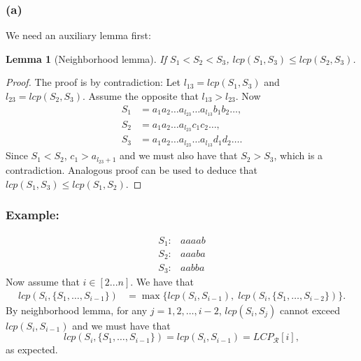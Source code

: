 \documentclass[10pt]{article}
\newtheorem{lemma}{Lemma}
\begin{document}
\subsubsection*{(a)}
We need an auxiliary lemma first: 
\begin{lemma}[Neighborhood lemma]
If $S_1 < S_2 < S_3$, $lcp(S_1, S_3) \leq lcp(S_2, S_3)$.
\end{lemma}
\begin{proof}
The proof is by contradiction: Let $l_{13} = lcp(S_1, S_3)$ and $l_{23} = lcp(S_2, S_3)$. Assume the opposite that $l_{13} > l_{23}$. 
Now 
\begin{align*}
S_1 &= a_1 a_2 \dots a_{l_{23}} \dots a_{l_{13}} b_1 b_2 \dots, \\
S_2 &= a_1 a_2 \dots a_{l_{23}} c_1 c_2 \dots, \\
S_3 &= a_1 a_2 \dots a_{l_{23}} \dots a_{l_{13}} d_1 d_2 \dots.
\end{align*}
Since $S_1 < S_2$, $c_1 > a_{l_{23} + 1}$ and we must also have that $S_2 > S_3$, which is a contradiction. Analogous proof can be used to deduce that $lcp(S_1, S_3) \leq lcp(S_1, S_2)$.
\end{proof}
\subsubsection*{Example:}
\begin{align*}
S_1: & aaaab \\
S_2: & aaaba \\
S_3: & aabba
\end{align*}
Now assume that $i \in [2...n]$. We have that
\begin{align*}
lcp(S_i, \{ S_1, \dots, S_{i - 1} \}) &= \max \{ lcp(S_i, S_{i - 1}), \; lcp(S_i, \{ S_1, \dots, S_{i - 2} \}) \}.
\end{align*}
By neighborhood lemma, for any $j = 1, 2, \dots, i - 2$, $lcp(S_i, S_j)$ cannot exceed $lcp(S_i, S_{i - 1})$ and we must have that 
\[
lcp(S_i, \{ S_1, \dots, S_{i - 1} \}) = lcp(S_i, S_{i - 1}) = LCP_{\mathcal{R}}[i],
\] 
as expected. 
\end{document}
